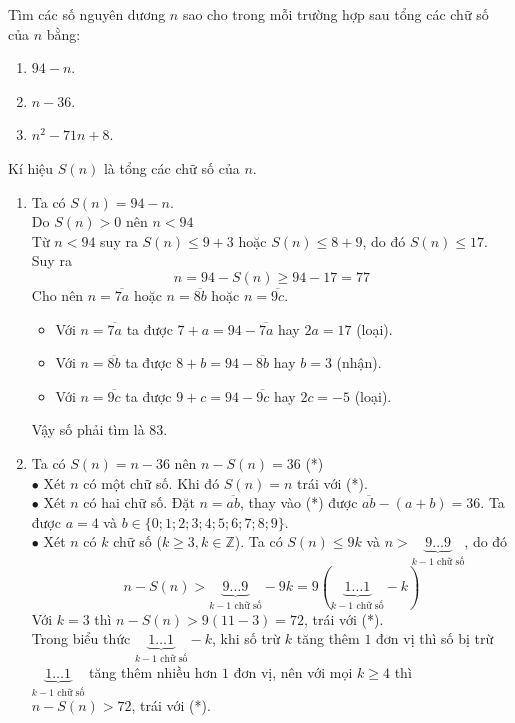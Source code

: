 \begin{bt}
 Tìm các số nguyên dương $n$  sao cho trong mỗi trường hợp sau tổng các chữ số của $n$ bằng:
 \begin{multicols}{3}
  \begin{enumerate}
   \item $94 - n$.
   \item $n - 36$.
   \item $n^2 - 71n + 8$.
  \end{enumerate}
 \end{multicols}
 \loigiai
  {
  Kí hiệu $S(n)$ là tổng các chữ số của $n$.
  \begin{enumerate}
   \item Ta có $S(n) = 94 - n$.\\
   Do $S(n) > 0$ nên $n < 94$\\
   Từ $n < 94$ suy ra $S(n) \leq 9 + 3$ hoặc $S(n) \leq 8 + 9$, do đó $S(n) \leq 17$. Suy ra
   $$n = 94 - S(n) \geq 94 - 17 = 77$$
   Cho nên $n = \overline{7a}$ hoặc $n = \overline{8b}$ hoặc $n = \overline{9c}$.
   \begin{itemize}
   	\item Với $n = \overline{7a}$ ta được $7 + a = 94 - \overline{7a}$ hay $2a = 17$ (loại).
   	\item Với $n = \overline{8b}$ ta được $8 + b = 94 - \overline{8b}$ hay $b = 3$ (nhận).
   	\item Với $n = \overline{9c}$ ta được $9 + c = 94 - \overline{9c}$ hay $2c = -5$ (loại).
   \end{itemize}
   Vậy số phải tìm là $83$.
   \item Ta có $S(n) = n - 36$ nên $n - S(n) = 36$ \hfill (*)\\
   $\bullet$ Xét $n$ có một chữ số. Khi đó $S(n) = n$ trái với (*).\\
   $\bullet$ Xét $n$ có hai chữ số. Đặt $n = \overline{ab}$, thay vào (*) được $\overline{ab} - (a + b) = 36$. Ta được $a = 4$ và $b \in \{0; 1; 2; 3; 4; 5; 6; 7; 8; 9\}$.\\
   $\bullet$ Xét $n$ có $k$ chữ số ($k \geq 3, k \in \mathbb{Z}$). Ta có $S(n) \leq 9k$ và $n > \underbrace{9 \ldots 9}_{k - 1 \text{ chữ số}}$, do đó
   $$n - S(n) > \underbrace{9 \ldots 9}_{k - 1 \text{ chữ số}} - 9k = 9 \left( \underbrace{1 \ldots 1}_{k - 1 \text{ chữ số}} - k \right)$$
   Với $k = 3$ thì $n - S(n) > 9(11 - 3) = 72$, trái với (*).\\
   Trong biểu thức $\underbrace{1 \ldots 1}_{k - 1 \text{ chữ số}} - k$, khi số trừ $k$ tăng thêm $1$ đơn vị thì số bị trừ $\underbrace{1 \ldots 1}_{k - 1 \text{ chữ số}}$ tăng thêm nhiều hơn $1$ đơn vị, nên với mọi $k \geq 4$ thì $n - S(n) > 72$, trái với (*).\\

\end{enumerate}}
\end{bt}
